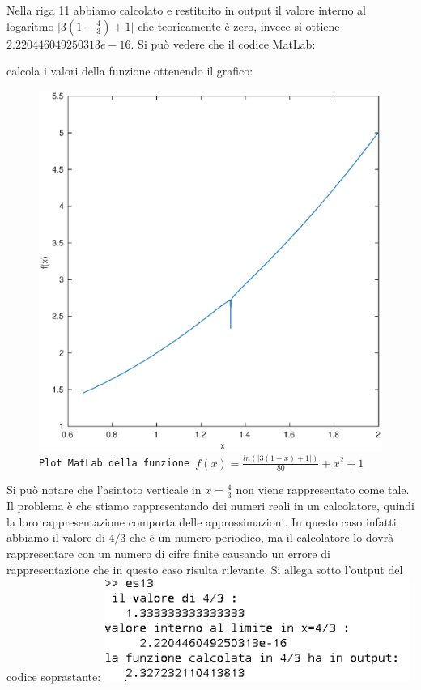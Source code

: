 \begin{flushleft}
Nella riga 11 abbiamo calcolato e restituito in output il valore interno al logaritmo $\big|3(1-\frac{4}{3})+1\big|$ che teoricamente è zero, invece si ottiene $2.220446049250313e-16 $. 
Si può vedere che il codice MatLab:

calcola i valori della funzione ottenendo il grafico:
\begin{figure}[H]
\label{fes113}
\includegraphics[width=450px]{plot/fes113}
\caption{\texttt{Plot MatLab della funzione $f(x)=\frac{ln(|3(1-x)+1|)}{80}+x^2+1$}}
\end{figure}
Si può notare che l'asintoto verticale in $x=\frac{4}{3}$ non viene rappresentato come tale. Il problema è che stiamo rappresentando dei numeri reali in un calcolatore, quindi la loro rappresentazione comporta delle approssimazioni. In questo caso infatti abbiamo il valore di $4/3$ che è un numero periodico, ma il calcolatore lo dovrà rappresentare con un numero di cifre finite causando un errore di rappresentazione che in questo caso risulta rilevante. Si allega sotto l'output del codice soprastante:
\includegraphics[width=10cm]{cap_1/es13/es113.png}
\end{flushleft}